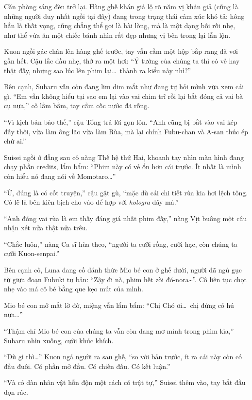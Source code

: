 \documentclass[../main.tex]{subfiles}
\begin{document}
Căn phòng sáng đèn trở lại. Hàng ghế khán giả lộ rõ năm vị khán giả (cũng là những người duy nhất ngồi tại đây) đang trong trạng thái cảm xúc khó tả: hông hẳn là thất vọng, cũng chẳng thể gọi là hài lòng, mà là một dạng bối rối nhẹ, như thể vừa ăn một chiếc bánh nhìn rất đẹp nhưng vị bên trong lại lẫn lộn.

Kuon ngồi gác chân lên hàng ghế trước, tay vẫn cầm một hộp bắp rang đã vơi gần hết. Cậu lắc đầu nhẹ, thở ra một hơi: ``Ý tưởng của chúng ta thì có vẻ hay thật đấy, nhưng sao lúc lên phim lại\dots\ thành ra kiểu này nhỉ?''

Bên cạnh, Subaru vẫn còn đang lim dim mắt như đang tự hỏi mình vừa xem cái gì. ``Em vẫn không hiểu tại sao em lại vào vai chim trĩ rồi lại bắt đóng cả vai bà cụ nữa,'' cô lầm bầm, tay cầm cốc nước đã rỗng.

``Vì kịch bản bảo thế,'' cậu Tổng trả lời gọn lỏn. ``Anh cũng bị bắt vào vai kép đấy thôi, vừa làm ông lão vừa làm Rùa, mà lại chính Fubu-chan và A-san thúc ép chứ ai.''

Suisei ngồi ở đằng sau cô nàng Thế hệ thứ Hai, khoanh tay nhìn màn hình đang chạy phần credits, lẩm bẩm: ``Phim này có vẻ ổn hơn cái trước. Ít nhất là mình còn hiểu nó đang nói về Momotaro\dots''

``Ừ, đúng là có cốt truyện,'' cậu gật gù, ``mặc dù cái chi tiết rùa kia hơi lệch tông. Có lẽ là bên kiên bịch cho vào để hợp với \textit{hologra} đây mà.''

``Anh đóng vai rùa là em thấy đáng giá nhất phim đấy,'' nàng Vịt buông một câu nhận xét nửa thật nửa trêu.

``Chắc luôn,'' nàng Ca sĩ hùa theo, ``người ta cưỡi rồng, cưỡi hạc, còn chúng ta cưỡi Kuon-senpai.''

Bên cạnh cô, Luna đang cố đánh thức Mio bé con ở ghế dưới, người đã ngủ gục từ giữa đoạn Fubuki tư bản: ``Zậy đi nà, phim hết zòi đó-nora\~{}''. Cô liên tục chọt nhẹ vào má cô bé bằng que kẹo mút của mình.

Mio bé con mở mắt lờ đờ, miệng vẫn lẩm bẩm: ``Chị Chó ơi\dots\ chị đừng có hú nữa\dots''

``Thậm chí Mio bé con của chúng ta vẫn còn đang mơ mình trong phim kìa,'' Subaru nhìn xuống, cười khúc khích.

``Dù gì thì\dots'' Kuon ngả người ra sau ghế, ``so với bản trước, ít ra cái này còn có đầu đuôi. Có phần mở đầu. Có chiến đấu. Có kết luận.''

``Và có dàn nhân vật hỗn độn một cách có trật tự,'' Suisei thêm vào, tay bắt đầu dọn rác.
\end{document}

